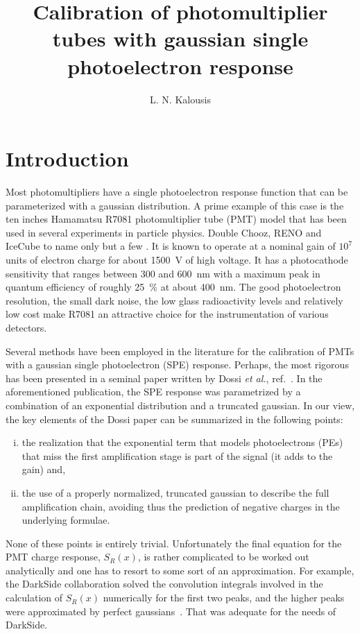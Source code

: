 \documentclass[a4paper,11pt]{article}
\title{\boldmath Calibration of photomultiplier tubes with gaussian single photoelectron response}
\author[a]{L. N. Kalousis}
\affiliation[a]{Physics Department, National Technical University, 157 80 Zografou, Athens, Greece}
\begin{document}
\maketitle
\flushbottom

\section{Introduction}
\label{sec:intro}

Most photomultipliers have a single photoelectron response function that can be parameterized with a gaussian distribution. 
A prime example of this case is the ten inches Hamamatsu R7081 photomultiplier tube (PMT) model that has been used in several experiments in particle physics. 
Double Chooz, RENO and IceCube to name only but a few \cite{dc,reno,icecube}.
It is known to operate at a nominal gain of $10^7$ units of electron charge for about 1500~V of high voltage. 
It has a photocathode sensitivity that ranges between 300 and 600~nm with a maximum peak in quantum efficiency of roughly 25~$\%$ at about 400~nm. 
The good photoelectron resolution, the small dark noise, the low glass radioactivity levels and relatively low cost make R7081 an attractive choice for the instrumentation of various detectors. 

Several methods have been employed in the literature for the calibration of PMTs with a gaussian single photoelectron (SPE) response. 
Perhaps, the most rigorous has been presented in a seminal paper written by Dossi \emph{et al.}, ref.~\cite{dossi}. 
In the aforementioned publication, the SPE response was parametrized by a combination of an exponential distribution and a truncated gaussian. 
In our view, the key elements of the Dossi paper can be summarized in the following points:
\begin{enumerate}[i.]
\item the realization that the exponential term that models photoelectrons (PEs) that miss the first amplification stage is part of the signal (it adds to the gain) and,
\item the use of a properly normalized, truncated gaussian to describe the full amplification chain, avoiding thus the prediction of negative charges in the underlying formulae. 
\end{enumerate}
None of these points is entirely trivial. 
Unfortunately the final equation for the PMT charge response, $S_R(x)$, is rather complicated to be worked out analytically and one has to resort to some sort of an approximation. 
For example, the DarkSide collaboration solved the convolution integrals involved in the calculation of $S_R(x)$ numerically for the first two peaks, and the higher peaks were approximated by perfect gaussians~\cite{darkside}. 
That was adequate for the needs of DarkSide. 
\end{document}
